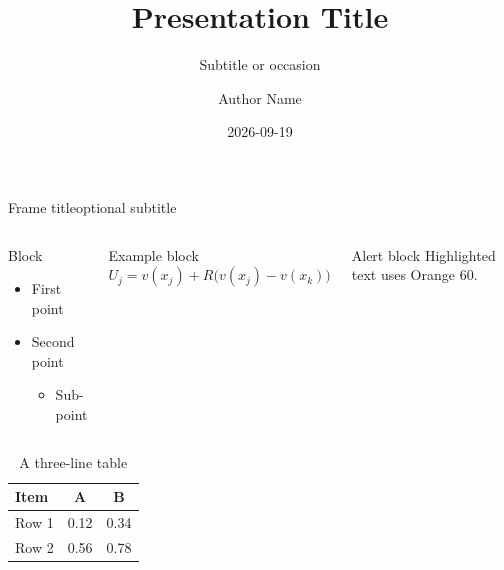 \documentclass[aspectratio=169,10pt]{beamer}
\title[Short title]{Presentation Title}
\subtitle{Subtitle or occasion}
\author[Author]{Author Name}
\institute{School of Economics and Management, Tsinghua University}
\date{2026-09-19}
\begin{document}
\begin{frame}[plain]
  \titlepage
\end{frame}

\begin{frame}{Frame title}{optional subtitle}
  \begin{columns}[T]
    \begin{block}{Block}
      \begin{itemize}
        \item First point
        \item Second point
          \begin{itemize}
            \item Sub-point
          \end{itemize}
      \end{itemize}
    \end{block}
    \begin{exampleblock}{Example block}
      $U_j = v(x_j) + R\big(v(x_j) - v(x_k)\big)$
    \end{exampleblock}
    \begin{alertblock}{Alert block}
      \alert{Highlighted} text uses Orange 60.
    \end{alertblock}
  \end{columns}
  \vskip 6pt
  \begin{table}
    \centering
    \caption{A three-line table}
    \begin{tabular}{lcc}
      \toprule
      Item & A & B \\
      \midrule
      Row 1 & 0.12 & 0.34 \\
      Row 2 & 0.56 & 0.78 \\
      \bottomrule
    \end{tabular}
  \end{table}
\end{frame}

\end{document}
